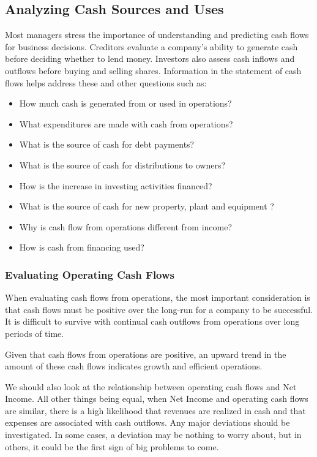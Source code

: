 \documentclass[../main.tex]{subfiles}
\begin{document}
	\subsection{Analyzing Cash Sources and Uses}

	Most managers stress the importance of understanding and predicting cash 
	flows for business decisions. Creditors evaluate a company’s ability to 
	generate cash before deciding whether to lend money. Investors also assess 
	cash inflows and outflows before buying and selling shares. Information in 
	the statement of cash flows helps address these and other questions such as:
	\begin{itemize}[noitemsep]
		\item How much cash is generated from or used in operations?
		\item What expenditures are made with cash from operations?
		\item What is the source of cash for debt payments?
		\item What is the source of cash for distributions to owners? 
		\item How is the increase in investing activities financed? 
		\item What is the source of cash for new property, plant and equipment ?
		\item Why is cash flow from operations different from income?
		\item How is cash from financing used?
	\end{itemize}

	\subsubsection{Evaluating Operating Cash Flows}

	When evaluating cash flows from operations, the most important 
	consideration is that cash flows must be positive over the long-run for a 
	company to be successful. It is difficult to survive with continual cash 
	outflows from operations over long periods of time. 
	
	Given that cash flows from operations are positive, an upward trend in the 
	amount of these cash flows indicates growth and efficient operations.
	
	
	We should also look at the relationship between operating cash flows and 
	Net Income. All other things being equal, when Net Income and operating 
	cash flows are similar, there is a high likelihood that revenues are 
	realized in cash and that expenses are associated with cash outflows. Any 
	major deviations should be investigated. In some cases, a deviation may be 
	nothing to worry about, but in others, it could be the first sign of big 
	problems to come.
	
\end{document}
